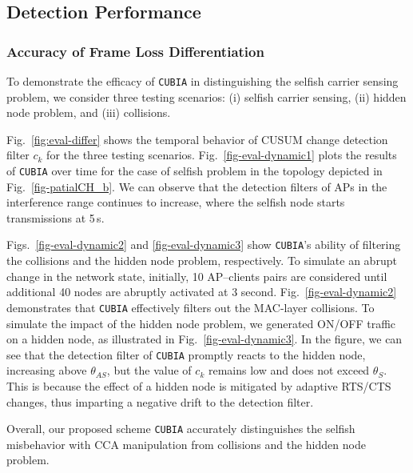 \subsection{Detection Performance}

\subsubsection{Accuracy of Frame Loss Differentiation}

To demonstrate the efficacy of {\tt CUBIA} in distinguishing
the selfish carrier sensing problem, we consider three testing
scenarios: (i) selfish carrier sensing, (ii) hidden node problem,
and (iii) collisions.
%

Fig.~\ref{fig:eval-differ} shows the temporal behavior of CUSUM
change detection filter $c_k$ for the three testing scenarios.
%
Fig.~\ref{fig-eval-dynamic1} plots the results of {\tt CUBIA} over
time for the case of selfish problem in the topology depicted in
Fig.~\ref{fig-patialCH_b}. We can observe that the detection filters
of APs in the interference range continues to increase, where the
selfish node starts transmissions at 5\,s.

Figs.~\ref{fig-eval-dynamic2} and \ref{fig-eval-dynamic3} show
{\tt CUBIA}'s ability of filtering the collisions and the hidden node
problem, respectively.
%
To simulate an abrupt change in the network state, initially,
10 AP--clients pairs are considered until additional 40 nodes
are abruptly activated at 3 second.
%
Fig.~\ref{fig-eval-dynamic2} demonstrates that {\tt CUBIA} effectively
filters out the MAC-layer collisions.
%
To simulate the impact of the hidden node problem, we generated ON/OFF
traffic on a hidden node, as illustrated in Fig.~\ref{fig-eval-dynamic3}.
In the figure, we can see that the detection filter of {\tt CUBIA}
promptly reacts to the hidden node, increasing above $\theta_{AS}$,
but the value of $c_k$ remains low and does not exceed $\theta_{S}$.
%
This is because the effect of a hidden node is mitigated by adaptive
RTS/CTS changes, thus imparting a negative drift to the detection filter.

Overall, our proposed scheme {\tt CUBIA} accurately distinguishes
the selfish misbehavior with CCA manipulation from collisions and
the hidden node problem.

